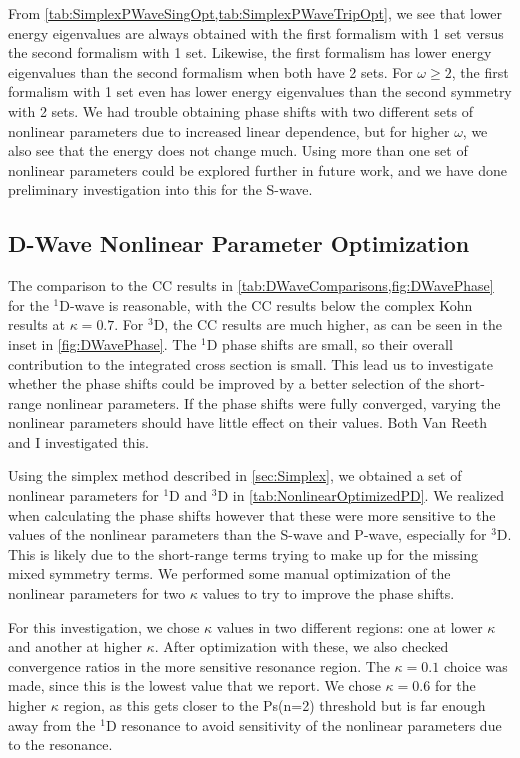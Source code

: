 \documentclass[Dissertation.tex]{subfiles}
\begin{document}
From \cref{tab:SimplexPWaveSingOpt,tab:SimplexPWaveTripOpt}, we see that 
lower energy eigenvalues are always obtained with the first formalism with 1 
set versus the second formalism with 1 set. Likewise, the first formalism has 
lower energy eigenvalues than the second formalism when both have 2 sets. For 
$\omega \geq 2$, the first formalism with 1 set even has lower energy 
eigenvalues than the second symmetry with 2 sets. We had trouble obtaining 
phase shifts with two different sets of nonlinear parameters due to increased 
linear dependence, but for higher $\omega$, we also see that the energy does 
not change much. Using more than one set of nonlinear parameters could be 
explored further in future work, and we have done preliminary investigation 
into this for the S-wave.


\subsection{D-Wave Nonlinear Parameter Optimization}
\label{sec:DWaveNonlinear}

The comparison to the CC results \cite{Walters2004,Blackwood2002}
in \cref{tab:DWaveComparisons,fig:DWavePhase} for the $^1$D-wave is
reasonable, with the CC results below the complex Kohn results at $\kappa = 0.7$.
For $^3$D, the CC results are much higher, as can be seen in the inset
in \cref{fig:DWavePhase}. The $^1$D phase shifts are small, so their overall
contribution to the integrated cross section is small. 
This lead us to investigate whether the phase shifts could be improved by a
better selection of the short-range nonlinear parameters. If the phase shifts
were fully converged, varying the nonlinear parameters should have little
effect on their values. Both Van Reeth \cite{VanReethPrivate} and I
investigated this.

Using the simplex method described in \cref{sec:Simplex}, we obtained a set of
nonlinear parameters for $^1$D and $^3$D in \cref{tab:NonlinearOptimizedPD}.
We realized when calculating the phase shifts however that these were more
sensitive to the values of the nonlinear parameters than the S-wave and P-wave,
especially for $^3$D. This is likely due to the short-range terms trying to
make up for the missing mixed symmetry terms. We performed some manual
optimization of the nonlinear parameters for two $\kappa$ values to try to
improve the phase shifts.

For this investigation, we chose $\kappa$ values in two different regions:
one at lower $\kappa$ and another at higher $\kappa$. After optimization with
these, we also checked convergence ratios in the more sensitive resonance
region. The $\kappa = 0.1$ choice
was made, since this is the lowest value that we report. We chose $\kappa = 0.6$
for the higher $\kappa$ region, as this gets closer to the Ps(n=2) threshold
but is far enough away from the $^1$D resonance to avoid sensitivity of the
nonlinear parameters due to the resonance.
\end{document}
